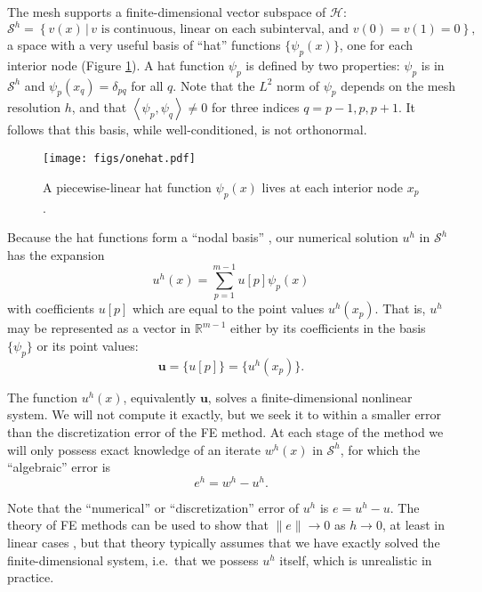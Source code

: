 \documentclass[letterpaper,final,12pt,reqno]{amsart}
\newcommand{\RR}{\mathbb{R}}
\newcommand{\bu}{\mathbf{u}}
\newcommand{\ip}[2]{\left<#1,#2\right>}
\begin{document}
The mesh supports a finite-dimensional vector subspace of $\mathcal{H}$:
\begin{equation}
\mathcal{S}^h = \left\{v(x)\,\big|\,v \text{ is continuous, linear on each subinterval, and } v(0)=v(1)=0\right\},  \label{fespace}
\end{equation}
a space with a very useful basis of ``hat'' functions $\{\psi_p(x)\}$, one for each interior node (Figure \ref{fig:onehat}).  A hat function $\psi_p$ is defined by two properties: $\psi_p$ is in $\mathcal{S}^h$ and $\psi_p(x_q)=\delta_{pq}$ for all $q$.  Note that the $L^2$ norm of $\psi_p$ depends on the mesh resolution $h$, and that $\ip{\psi_p}{\psi_q}\ne 0$ for three indices $q=p-1,p,p+1$.  It follows that this basis, while well-conditioned, is not orthonormal.

\begin{figure}
\texttt{[image: figs/onehat.pdf]}
\caption{A piecewise-linear hat function $\psi_p(x)$ lives at each interior node $x_p$.}
\label{fig:onehat}
\end{figure}

Because the hat functions form a ``nodal basis'' \cite{Elmanetal2014}, our numerical solution $u^h$ in $\mathcal{S}^h$ has the expansion
\begin{equation}
  u^h(x) = \sum_{p=1}^{m-1} u[p] \psi_p(x)  \label{fesolution}
\end{equation}
with coefficients $u[p]$ which are equal to the point values $u^h(x_p)$.  That is, $u^h$ may be represented as a vector in $\RR^{m-1}$ either by its coefficients in the basis $\{\psi_p\}$ or its point values:
\begin{equation}
\bu =\{u[p]\} = \{u^h(x_p)\}.  \label{fevector}
\end{equation}

The function $u^h(x)$, equivalently $\bu$, solves a finite-dimensional nonlinear system.  We will not compute it exactly, but we seek it to within a smaller error than the discretization error of the FE method.  At each stage of the method we will only possess exact knowledge of an iterate $w^h(x)$ in $\mathcal{S}^h$, for which the ``algebraic'' error is
\begin{equation}
  e^h = w^h - u^h.  \label{feerror}
\end{equation}

Note that the ``numerical'' or ``discretization'' error of $u^h$ is $e=u^h-u$.  The theory of FE methods can be used to show that $\|e\|\to 0$ as $h\to 0$, at least in linear cases \cite{Elmanetal2014}, but that theory typically assumes that we have exactly solved the finite-dimensional system, i.e.~that we possess $u^h$ itself, which is unrealistic in practice.
\end{document}
